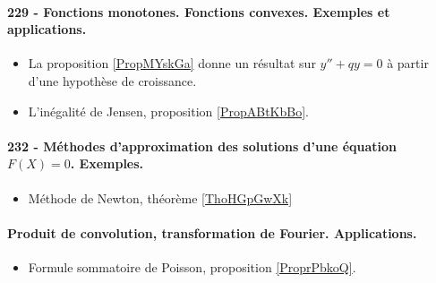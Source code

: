 \paragraph{229 - Fonctions monotones. Fonctions convexes. Exemples et applications.}
\begin{itemize}
    \item La proposition \ref{PropMYskGa} donne un résultat sur \( y''+qy=0\) à partir d'une hypothèse de croissance.
    \item L'inégalité de Jensen, proposition \ref{PropABtKbBo}.
\end{itemize}
\paragraph{232 - Méthodes d'approximation des solutions d’une équation $F(X)=0$. Exemples.}
\begin{itemize}
    \item Méthode de Newton, théorème \ref{ThoHGpGwXk}
\end{itemize}
\paragraph{Produit de convolution, transformation de Fourier. Applications.}
\begin{itemize}
    \item Formule sommatoire de Poisson, proposition \ref{ProprPbkoQ}.
\end{itemize}
